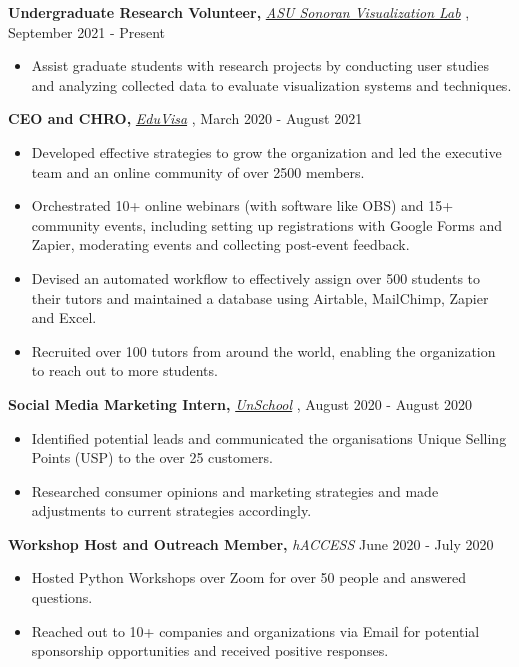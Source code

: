 \documentclass[a4paper]{article}
\begin{document}
{\textbf{Undergraduate Research Volunteer, } \textit{\href{https://news.asu.edu/20200225-solutions-data-driven-quest-resilient-power-systems}{ASU Sonoran Visualization Lab} \faExternalLink}, \hfill September 2021 - Present\\
\vspace{-3mm}
\begin{itemize}
    \item Assist graduate students with research projects by conducting user studies and analyzing collected data to evaluate visualization systems and techniques. 
\end{itemize}

\textbf{CEO and CHRO, }\textit{{\href{https://myeduvisa.org/}{EduVisa}} \faExternalLink},   \hfill March 2020 - August 2021\\
\vspace{-3mm}
\begin{itemize} \itemsep 1pt
	\item Developed effective strategies to grow the organization and led the executive team and an online community of over 2500 members.
	\item Orchestrated 10+ online webinars (with software like OBS) and 15+ community events, including setting up registrations with Google Forms and Zapier, moderating events and collecting post-event feedback.
	\item Devised an automated workflow to effectively assign over 500 students to their tutors and maintained a database using Airtable, MailChimp, Zapier and Excel.
	\item Recruited over 100 tutors from around the world, enabling the organization to reach out to more students.
\end{itemize}

\textbf{Social Media Marketing Intern, }\textit{{\href{https://www.unschool.in/}{UnSchool}} \faExternalLink},  \hfill August 2020 - August 2020\\
\vspace{-3mm}
\begin{itemize} \itemsep 1pt
	\item Identified potential leads and communicated the organisation\textquotesingle{}s Unique Selling Points (USP) to the over 25 customers.
	\item Researched consumer opinions and marketing strategies and made adjustments to current strategies accordingly.
\end{itemize}

\textbf{Workshop Host and Outreach Member, }\textit{hACCESS}  \hfill June 2020 - July 2020\\
\vspace{-3mm}
\begin{itemize} \itemsep 1pt
	\item Hosted Python Workshops over Zoom for over 50 people and answered questions.
	\item Reached out to 10+ companies and organizations via Email for potential sponsorship opportunities and received positive responses.
\end{itemize}

}
\end{document}
